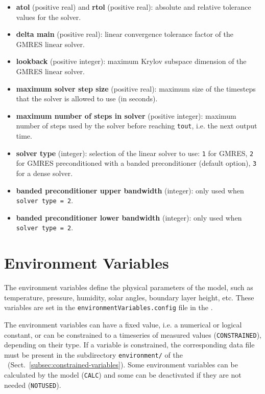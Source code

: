 \begin{itemize}
\item \textbf{atol} (positive real) and \textbf{rtol} (positive real):
  absolute and relative tolerance values for the solver.
\item \textbf{delta main} (positive real): linear convergence
  tolerance factor of the GMRES linear solver.
\item \textbf{lookback} (positive integer): maximum Krylov subspace
  dimension of the GMRES linear solver.
\item \textbf{maximum solver step size} (positive real): maximum size
  of the timesteps that the solver is allowed to use (in seconds).
\item \textbf{maximum number of steps in solver} (positive integer):
  maximum number of steps used by the solver before reaching
  \texttt{tout}, i.e. the next output time.
\item \textbf{solver type} (integer): selection of the linear solver
  to use: \texttt{1} for GMRES, \texttt{2} for GMRES preconditioned
  with a banded preconditioner (default option), \texttt{3} for a
  dense solver.
\item \textbf{banded preconditioner upper bandwidth} (integer): only
  used when \texttt{solver\ type\ =\ 2}.
\item \textbf{banded preconditioner lower bandwidth} (integer): only
  used when \texttt{solver\ type\ =\ 2}.
\end{itemize}

\section{Environment Variables} \label{sec:environment-variables}

The environment variables define the physical parameters of the model, such as temperature,
pressure, humidity, solar angles, boundary layer height, etc. These variables are set in
the \texttt{environmentVariables.config} file in the \configdir.

The environment variables can have a fixed value, i.e. a numerical or logical constant, or can
be constrained to a timeseries of measured values (\texttt{CONSTRAINED}), depending on their
type. If a variable is constrained, the corresponding data file must be present in the
subdirectory \texttt{environment/} of the \constrdir\ (Sect.~\ref{subsec:constrained-variables}).
Some environment variables can be calculated by the model (\texttt{CALC}) and some can be
deactivated if they are not needed (\texttt{NOTUSED}).

